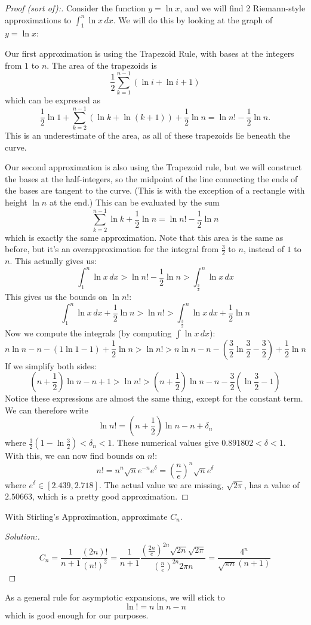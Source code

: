 \documentclass[11pt,twosided]{article}
\begin{document}
\begin{proof}[Proof (sort of):]
Consider the function $y = \ln x$, and we will find 2 Riemann-style approximations to $\int_1^n \ln x \, dx$. We will do this by looking at the graph of $y = \ln x$: 

Our first approximation is using the Trapezoid Rule, with bases at the integers from $1$ to $n$. The area of the trapezoids is 
\[
\frac{1}{2} \sum_{k=1}^{n-1} (\ln i + \ln i+1)
\]
which can be expressed as 
\[
\frac{1}{2} \ln 1 + \sum_{k=2}^{n-1} (\ln k + \ln (k+1)) + \frac{1}{2} \ln n = \ln n! - \frac{1}{2} \ln n. 
\] 
This is an underestimate of the area, as all of these trapezoids lie beneath the curve. 

Our second approximation is also using the Trapezoid rule, but we will construct the bases at the half-integers, so the midpoint of the line connecting the ends of the bases are tangent to the curve. (This is with the exception of a rectangle with height $\ln n$ at the end.) This can be evaluated by the sum 
\[
	\sum_{k=2}^{n-1} \ln k + \frac{1}{2} \ln n = \ln n! - \frac{1}{2} \ln n
\]
which is exactly the same approximation. Note that this area is the same as before, but it's an overapproximation for the integral from $\frac{3}{2}$ to $n$, instead of $1$ to $n$. This actually gives us: 
\[
	\int_1^n \ln x \, dx > \ln n! - \frac{1}{2} \ln n > \int_{\frac{3}{2}}^n \ln x \, dx 
\]
This gives us the bounds on $\ln n!$: 
\[
\int_1^n \ln x \, dx + \frac{1}{2} \ln n > \ln n! > \int_{\frac{3}{2}}^n \ln x \, dx + \frac{1}{2} \ln n
\]
Now we compute the integrals (by computing $\int \ln x \, dx$): 
\[
n \ln n - n - (1 \ln 1 - 1) + \frac{1}{2} \ln n > \ln n! > n \ln n - n - \left(\frac{3}{2} \ln \frac{3}{2} - \frac{3}{2} \right) + \frac{1}{2} \ln n
\]
If we simplify both sides: 
\[
\left(n + \frac{1}{2} \right)\ln n - n + 1 > \ln n! > \left( n + \frac{1}{2} \right) \ln n - n - \frac{3}{2} \left( \ln \frac{3}{2} - 1 \right) 
\]
Notice these expressions are almost the same thing, except for the constant term. We can therefore write 
\[
	\ln n! = \left(n + \frac{1}{2} \right)\ln n - n + \delta_n
\]
where $\frac{3}{2} \left( 1 - \ln \frac{3}{2} \right) < \delta_n < 1$. These numerical values give $0.891802 < \delta < 1$. With this, we can now find bounds on $n!$: 
\[
	n! = n^n \sqrt{n} e^{-n} e^\delta = \left( \frac{n}{e} \right)^n \sqrt{n} e^{\delta}
\]
where $e^\delta \in [2.439, 2.718]$. The actual value we are missing, $\sqrt{2\pi}$, has a value of $2.50663$, which is a pretty good approximation. 
\end{proof}
\begin{problem}{1}
	With Stirling's Approximation, approximate $C_n$. 
\end{problem}
\begin{proof}[Solution:]
\[
	C_n = \frac{1}{n+1} \frac{(2n)!}{(n!)^2} = \frac{1}{n+1} \frac{\left(\frac{2n}{e} \right)^{2n} \sqrt{2n} \sqrt{2\pi}}{\left(\frac{n}{e} \right)^{2n} 2\pi n} = \frac{4^{n}}{\sqrt{\pi n}(n+1)}
\]
\end{proof}
As a general rule for asymptotic expansions, we will stick to 
\[
	\ln! = n \ln n - n
\]
which is good enough for our purposes. 
\end{document}
